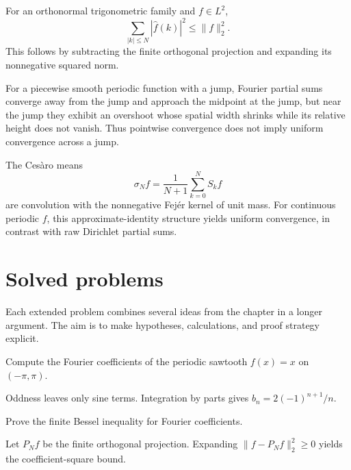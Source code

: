 \begin{example}\label{ex:iii09-worked-02}
For an orthonormal trigonometric family and \(f\in L^2\),
\[
\sum_{|k|\le N}|\widehat f(k)|^2\le\|f\|_2^2.
\]
This follows by subtracting the finite orthogonal projection and expanding its
nonnegative squared norm.
\end{example}

\begin{example}\label{ex:iii09-worked-03}
For a piecewise smooth periodic function with a jump, Fourier partial sums
converge away from the jump and approach the midpoint at the jump, but near
the jump they exhibit an overshoot whose spatial width shrinks while its
relative height does not vanish. Thus pointwise convergence does not imply
uniform convergence across a jump.
\end{example}

\begin{example}\label{ex:iii09-worked-04}
The Cesàro means
\[
\sigma_Nf=\frac1{N+1}\sum_{k=0}^NS_kf
\]
are convolution with the nonnegative Fejér kernel of unit mass. For continuous
periodic \(f\), this approximate-identity structure yields uniform convergence,
in contrast with raw Dirichlet partial sums.
\end{example}

\section{Solved problems}
Each extended problem combines several ideas from the chapter in a longer argument. The aim is to make hypotheses, calculations, and proof strategy explicit.

\begin{problem}\label{prob:iii09-problem-01}
Compute the Fourier coefficients of the periodic sawtooth \(f(x)=x\) on \((-\pi,\pi)\).
\end{problem}
\begin{solution}
Oddness leaves only sine terms. Integration by parts gives
\(b_n=2(-1)^{n+1}/n\).
\end{solution}

\begin{problem}\label{prob:iii09-problem-02}
Prove the finite Bessel inequality for Fourier coefficients.
\end{problem}
\begin{solution}
Let \(P_Nf\) be the finite orthogonal projection. Expanding
\(\|f-P_Nf\|_2^2\ge0\) yields the coefficient-square bound.
\end{solution}

